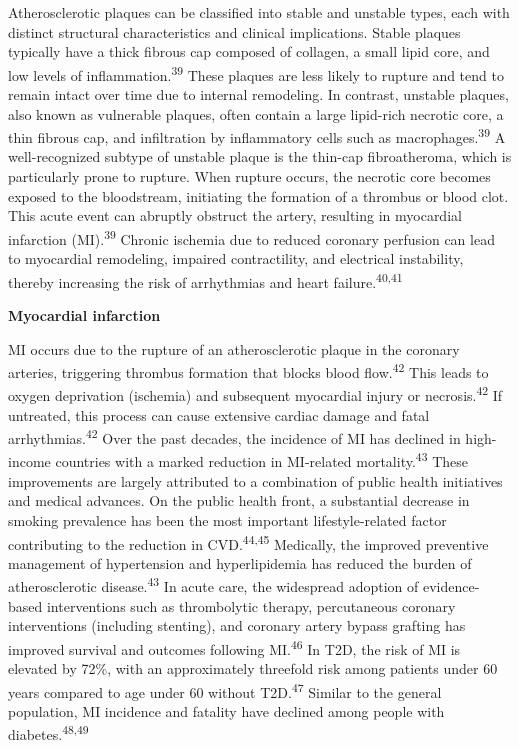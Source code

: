 \documentclass[
  letterpaper,
  headsepline=true,
  open=any]{scrbook}
\begin{document}
Atherosclerotic plaques can be classified into stable and unstable
types, each with distinct structural characteristics and clinical
implications. Stable plaques typically have a thick fibrous cap composed
of collagen, a small lipid core, and low levels of
inflammation.\textsuperscript{39} These plaques are less likely to
rupture and tend to remain intact over time due to internal remodeling.
In contrast, unstable plaques, also known as vulnerable plaques, often
contain a large lipid-rich necrotic core, a thin fibrous cap, and
infiltration by inflammatory cells such as
macrophages.\textsuperscript{39} A well-recognized subtype of unstable
plaque is the thin-cap fibroatheroma, which is particularly prone to
rupture. When rupture occurs, the necrotic core becomes exposed to the
bloodstream, initiating the formation of a thrombus or blood clot. This
acute event can abruptly obstruct the artery, resulting in myocardial
infarction (MI).\textsuperscript{39} Chronic ischemia due to reduced
coronary perfusion can lead to myocardial remodeling, impaired
contractility, and electrical instability, thereby increasing the risk
of arrhythmias and heart failure.\textsuperscript{40,41}

\textbf{Myocardial infarction}

MI occurs due to the rupture of an atherosclerotic plaque in the
coronary arteries, triggering thrombus formation that blocks blood
flow.\textsuperscript{42} This leads to oxygen deprivation (ischemia)
and subsequent myocardial injury or necrosis.\textsuperscript{42} If
untreated, this process can cause extensive cardiac damage and fatal
arrhythmias.\textsuperscript{42} Over the past decades, the incidence of
MI has declined in high-income countries with a marked reduction in
MI-related mortality.\textsuperscript{43} These improvements are largely
attributed to a combination of public health initiatives and medical
advances. On the public health front, a substantial decrease in smoking
prevalence has been the most important lifestyle-related factor
contributing to the reduction in CVD.\textsuperscript{44,45} Medically,
the improved preventive management of hypertension and hyperlipidemia
has reduced the burden of atherosclerotic disease.\textsuperscript{43}
In acute care, the widespread adoption of evidence-based interventions
such as thrombolytic therapy, percutaneous coronary interventions
(including stenting), and coronary artery bypass grafting has improved
survival and outcomes following MI.\textsuperscript{46} In T2D, the risk
of MI is elevated by 72\%, with an approximately threefold risk among
patients under 60 years compared to age under 60 without
T2D.\textsuperscript{47} Similar to the general population, MI incidence
and fatality have declined among people with
diabetes.\textsuperscript{48,49}
\end{document}
